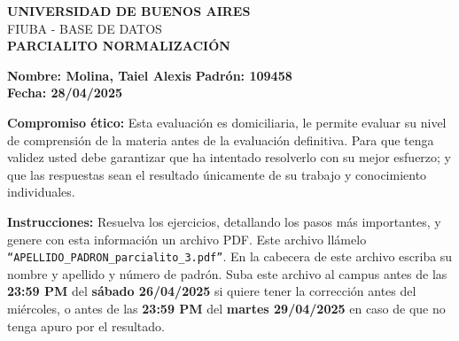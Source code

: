 \documentclass[a4paper,12pt]{article}
\begin{document}
\begin{center}
    \Large \textbf{UNIVERSIDAD DE BUENOS AIRES}\\
    \large FIUBA - BASE DE DATOS\\
    \vspace{0.5cm}
    \large \textbf{PARCIALITO NORMALIZACIÓN}
\end{center}

\vspace{0.5cm}

\noindent
\textbf{Nombre: Molina, Taiel Alexis} \hfill \textbf{Padrón: 109458}  \\
\textbf{Fecha: 28/04/2025} \\

\vspace{0.5cm}

\noindent
\textbf{Compromiso ético:} Esta evaluación es domiciliaria, le permite evaluar su nivel de comprensión de la materia antes de la evaluación definitiva. Para que tenga validez usted debe garantizar que ha intentado resolverlo con su mejor esfuerzo; y que las respuestas sean el resultado únicamente de su trabajo y conocimiento individuales.

\vspace{0.5cm}

\noindent
\textbf{Instrucciones:} Resuelva los ejercicios, detallando los pasos más importantes, y genere con esta información un archivo PDF. Este archivo llámelo \texttt{``APELLIDO\_PADRON\_parcialito\_3.pdf''}. En la cabecera de este archivo escriba su nombre y apellido y número de padrón. Suba este archivo al campus antes de las \textbf{23:59 PM} del \textbf{sábado 26/04/2025} si quiere tener la corrección antes del miércoles, o antes de las \textbf{23:59 PM} del \textbf{martes 29/04/2025} en caso de que no tenga apuro por el resultado.

\vspace{0.5cm}
\end{document}

